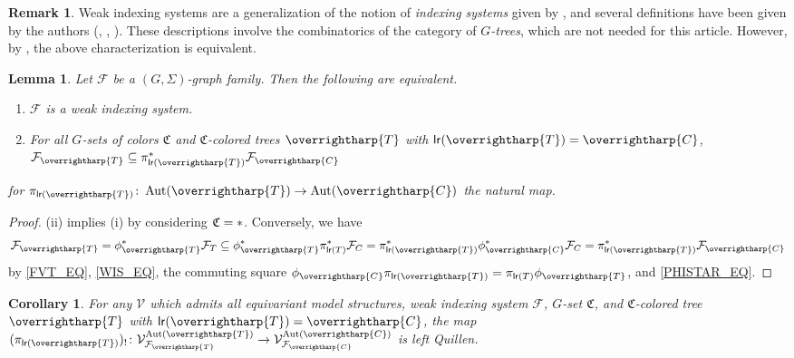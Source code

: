 \documentclass[a4paper,10pt
,draft
]{article}%
\numberwithin{equation}{section}
\numberwithin{figure}{section}
\newtheorem{lemma}[equation]{Lemma}%
\newtheorem{corollary}[equation]{Corollary}%
\theoremstyle{definition} %
\newtheorem{remark}[equation]{Remark}%
\newcommand{\vect}[1]{\text{\overrightharp{\ensuremath{#1}}}}
\DeclareMathOperator{\Aut}{Aut}%
\newcommand{\F}{\ensuremath{\mathcal F}}
\newcommand{\V}{\ensuremath{\mathcal V}}
\newcommand{\1}{\ensuremath{\mathbbm 1}}%
\begin{document}
\begin{remark}
      Weak indexing systems are a generalization of the notion of \textit{indexing systems} given by \cite[Defn. 3.22]{BH15},
      and several definitions have been given by the authors
      (\cite[Defn. 9.5]{Per18}, \cite[Defn. 4.49]{BP_geo}, \cite[Defn. 6.2]{BP_edss}).
      These descriptions involve the combinatorics of the category of \textit{$G$-trees},
      which are not needed for this article.
      However, by \cite[Remark 6.45]{BP_geo}, the above characterization is equivalent.
\end{remark}


\begin{lemma}
      Let $\F$ be a $(G,\Sigma)$-graph family. Then the following are equivalent.
      \begin{enumerate}[label = (\roman*)]
      \item $\F$ is a weak indexing system.
      \item For all $G$-sets of colors $\mathfrak C$ and $\mathfrak C$-colored trees $\vect T$ with $\mathsf{lr}(\vect T) = \vect C$, 
            $\F_{\vect T} \subseteq \pi_{\mathsf{lr}(\vect T)}^{\**}\F_{\vect C}$
      \end{enumerate}
      for $\pi_{\mathsf{lr}(\vect T)} \colon \Aut(\vect T) \to \Aut(\vect C)$ the natural map.
\end{lemma}
\begin{proof}
      (ii) implies (i) by considering $\mathfrak C = \**$.
      Conversely, we have
      \[
            \F_{\vect T} = 
            \phi_{\vect T}^{\**}\F_T \subseteq
            \phi_{\vect T}^{\**}\pi_{\mathsf{lr}(T)}^{\**} \F_C =
            \pi_{\mathsf{lr}(\vect T)}^{\**} \phi_{\vect C}^{\**} \F_C =
            \pi_{\mathsf{lr}(\vect T)}^{\**} \F_{\vect C}
      \]
      by \eqref{FVT_EQ}, \eqref{WIS_EQ},
      the commuting square $\phi_{\vect C} \pi_{\mathsf{lr}(\vect T)} = \pi_{\mathsf{lr}(T)} \phi_{\vect T}$,
      and \eqref{PHISTAR_EQ}.
\end{proof}

\begin{corollary}
      \label{PIVECTT_COR}
      For any $\V$ which admits all equivariant model structures, weak indexing system $\F$,
      $G$-set $\mathfrak C$, and $\mathfrak C$-colored tree $\vect T$ with $\mathsf{lr}(\vect T) = \vect C$,
      the map $(\pi_{\mathsf{lr}(\vect T)})_! \colon \V^{\Aut(\vect T)}_{\F_{\vect T}} \to \V^{\Aut(\vect C)}_{\F_{\vect C}}$ is left Quillen.
\end{corollary}
\end{document}
